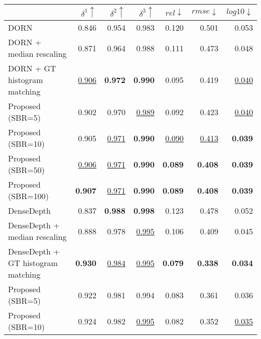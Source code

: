 \begin{tabular}{lrrr|rrr}
\toprule
{} & $\delta^1 \uparrow$ & $\delta^2 \uparrow$ & $\delta^3 \uparrow$ &   $rel \downarrow$ &  $rmse \downarrow$ & $log10 \downarrow$ \\
\midrule
DORN                               &               0.846 &               0.954 &               0.983 &              0.120 &              0.501 &              0.053 \\
DORN + median rescaling            &               0.871 &               0.964 &               0.988 &              0.111 &              0.473 &              0.048 \\
DORN + GT histogram matching       &   \underline{0.906} &      \textbf{0.972} &      \textbf{0.990} &              0.095 &              0.419 &  \underline{0.040} \\
Proposed (SBR=5)                   &               0.902 &               0.970 &   \underline{0.989} &              0.092 &              0.423 &  \underline{0.040} \\
Proposed (SBR=10)                  &               0.905 &   \underline{0.971} &      \textbf{0.990} &  \underline{0.090} &  \underline{0.413} &     \textbf{0.039} \\
Proposed (SBR=50)                  &   \underline{0.906} &   \underline{0.971} &      \textbf{0.990} &     \textbf{0.089} &     \textbf{0.408} &     \textbf{0.039} \\
Proposed (SBR=100)                 &      \textbf{0.907} &   \underline{0.971} &      \textbf{0.990} &     \textbf{0.089} &     \textbf{0.408} &     \textbf{0.039} \\
\midrule
DenseDepth                         &               0.837 &      \textbf{0.988} &      \textbf{0.998} &              0.123 &              0.478 &              0.052 \\
DenseDepth + median rescaling      &               0.888 &               0.978 &   \underline{0.995} &              0.106 &              0.409 &              0.045 \\
DenseDepth + GT histogram matching &      \textbf{0.930} &   \underline{0.984} &   \underline{0.995} &     \textbf{0.079} &     \textbf{0.338} &     \textbf{0.034} \\
Proposed (SBR=5)                   &               0.922 &               0.981 &               0.994 &              0.083 &              0.361 &              0.036 \\
Proposed (SBR=10)                  &               0.924 &               0.982 &   \underline{0.995} &              0.082 &              0.352 &  \underline{0.035} \\

\end{tabular}
